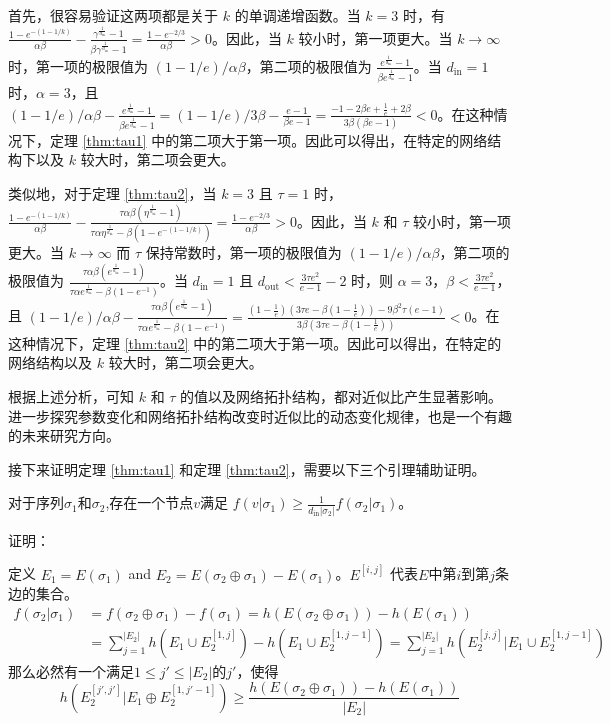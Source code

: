 首先，很容易验证这两项都是关于 $k$ 的单调递增函数。当 $k=3$ 时，有 $\frac{1-e^{-(1-1/k)}}{\alpha\beta}-\frac{\gamma^{\frac{1}{d_{\text{in}}}}-1}{\beta \gamma^{\frac{1}{d_{\text{in}}}}-1} = \frac{1-e^{-2/3}}{\alpha \beta}>0$。因此，当 $k$ 较小时，第一项更大。当 $k \to \infty$ 时，第一项的极限值为 $(1-1/e)/\alpha\beta$，第二项的极限值为 $\frac{e^{\frac{1}{d_{\text{in}}}}-1}{\beta e^{\frac{1}{d_{\text{in}}}}-1}$。当 $d_{\text{in}}=1$ 时，$\alpha=3$，且 $(1-1/e)/\alpha\beta-\frac{e^{\frac{1}{d_{\text{in}}}}-1}{\beta e^{\frac{1}{d_{\text{in}}}}-1} =(1-1/e)/3\beta-\frac{e-1}{\beta e-1}=\frac{-1-2\beta e +\frac{1}{e}+2\beta}{3\beta(\beta e-1)}<0$。在这种情况下，定理 \ref{thm:tau1} 中的第二项大于第一项。因此可以得出，在特定的网络结构下以及 $k$ 较大时，第二项会更大。

类似地，对于定理 \ref{thm:tau2}，当 $k=3$ 且 $\tau=1$ 时，$\frac{1-e^{-(1-1/k)}}{\alpha\beta}-\frac{\tau\alpha\beta(\eta^{\frac{1}{d_{\text{in}}}}-1)}{\tau\alpha\eta^{\frac{1}{d_{\text{in}}}}- \beta (1-e^{-(1-1/k)})} = \frac{1-e^{-2/3}}{\alpha \beta}>0$。因此，当 $k$ 和 $\tau$ 较小时，第一项更大。当 $k \to \infty$ 而 $\tau$ 保持常数时，第一项的极限值为 $(1-1/e)/\alpha\beta$，第二项的极限值为 $\frac{\tau\alpha\beta(e^{\frac{1}{d_{\text{in}}}}-1)}{\tau\alpha e^{\frac{1}{d_{\text{in}}}}- \beta (1-e^{-1}) }$。当 $d_{\text{in}}=1$ 且 $d_{\text{out}}<\frac{3\tau e^2}{e-1}-2$ 时，则 $\alpha=3$，$\beta < \frac{3\tau e^2}{e-1}$，且 $(1-1/e)/\alpha\beta-\frac{\tau\alpha\beta(e^{\frac{1}{d_{\text{in}}}}-1)}{\tau\alpha e^{\frac{1}{d_{\text{in}}}}- \beta (1-e^{-1}) } = \frac{(1-\frac{1}{e})(3\tau e -\beta(1-\frac{1}{e}))-9\beta^2 \tau(e-1)}{3\beta(3\tau e -\beta(1-\frac{1}{e}))}<0$。在这种情况下，定理 \ref{thm:tau2} 中的第二项大于第一项。因此可以得出，在特定的网络结构以及 $k$ 较大时，第二项会更大。

根据上述分析，可知 $k$ 和 $\tau$ 的值以及网络拓扑结构，都对近似比产生显著影响。进一步探究参数变化和网络拓扑结构改变时近似比的动态变化规律，也是一个有趣的未来研究方向。

接下来证明定理 \ref{thm:tau1} 和定理 \ref{thm:tau2}，需要以下三个引理辅助证明。

\begin{lemma}
\label{lem:lem1}
对于序列$\sigma_1$和$\sigma_2$,存在一个节点$v$满足 $f(v|\sigma_1) \ge \frac{1}{d_{\text{in}}|\sigma_2|} f(\sigma_2|\sigma_1)$。
\end{lemma}

\noindent 证明：

定义 $E_1=E(\sigma_1)$ and $E_2=E(\sigma_2 \oplus \sigma_1)-E(\sigma_1)$。$E^{[i,j]}$ 代表$E$中第$i$到第$j$条边的集合。
\begin{align}
    f(\sigma_2|\sigma_1) & = f(\sigma_2 \oplus \sigma_1) - f(\sigma_1) = h(E(\sigma_2 \oplus \sigma_1)) - h(E(\sigma_1)) \\
    & = \sum^{|E_2|}_{j=1} h(E_1 \cup E_2^{[1,j]}) - h(E_1 \cup E_2^{[1,j-1]}) = \sum_{j=1}^{|E_2|} h(E_2^{[j,j]} | E_1 \cup E_2^{[1,j-1]})
\end{align}
那么必然有一个满足$1\le j' \le |E_2|$的$j'$，使得
\begin{equation}
    h(E_2^{[j',j']} | E_1 \oplus E_2^{[1,j'-1]}) \ge \frac{h(E(\sigma_2 \oplus \sigma_1)) - h(E(\sigma_1))}{|E_2|}   
\end{equation}


